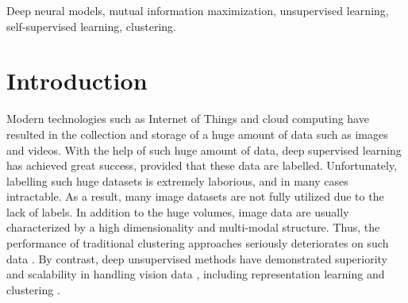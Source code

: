 \documentclass[journal]{IEEEtran}
\begin{document}
\begin{IEEEkeywords}
Deep neural models, mutual information maximization, unsupervised learning, self-supervised learning, clustering.
\end{IEEEkeywords}

\IEEEdisplaynontitleabstractindextext

\IEEEpeerreviewmaketitle

\section{Introduction}\label{sec:introduction}

Modern technologies such as Internet of Things and cloud computing have resulted in the collection and storage of a huge amount of data such as images and videos. With the help of such huge amount of data, deep supervised learning \cite{7780459,7298594} has achieved great success, provided that these data are labelled. Unfortunately, labelling such huge datasets is extremely laborious, and in many cases intractable. As a result, many image datasets are not fully utilized due to the lack of labels. In addition to the huge volumes, image data are usually characterized by a high dimensionality and multi-modal structure. Thus, the performance of traditional clustering approaches \cite{BEZDEK1984191,DBLP:conf/iccv/ComaniciuM99,Heller2005BayesianHC,Williams1999AMA,10.1007/978-3-642-33718-5_31} seriously deteriorates on such data  \cite{DBLP:conf/iccv/ChangWMXP17,Steinbach2004}. By contrast, deep unsupervised methods have demonstrated superiority and scalability in handling vision data \cite{NIPS2012_c399862d}, including representation learning \cite{caron2020unsupervised,pmlr-v119-chen20j,He_2020_CVPR} and clustering \cite{8237888,DBLP:conf/eccv/HanPPKC20,Ji_2019_ICCV,Ren2020DeepDI,10.1007/978-3-030-58607-2_16}.
\end{document}
